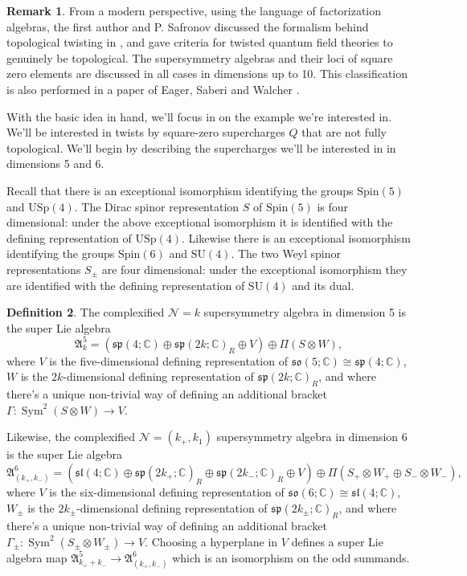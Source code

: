 \documentclass[11pt, oneside, reqno]{amsart}
\theoremstyle{definition} \newtheorem{definition}{Definition}[section]
\theoremstyle{definition} \newtheorem{remark}[definition]{Remark}
\theoremstyle{definition} \newtheorem{remarks}[definition]{Remarks}
\theoremstyle{definition} \newtheorem{question}[definition]{Question}
\theoremstyle{definition} \newtheorem*{note}{Note}
\theoremstyle{definition} \newtheorem{example}[definition]{Example}
\theoremstyle{definition} \newtheorem{examples}[definition]{Examples}
\newcommand{\mr}[1]{\mathrm{#1}}
\newcommand{\mc}[1]{\mathcal{#1}}
\newcommand{\mf}[1]{\mathfrak{#1}}
\newcommand{\CC}{\mathbb{C}}
\newcommand{\SU}{\mathrm{SU}}
\newcommand{\Spin}{\mathrm{Spin}}
\newcommand{\so}{\mathfrak{so}}
\renewcommand{\sl}{\mathfrak{sl}}
\renewcommand{\sp}{\mathfrak{sp}}
\newcommand{\iso}{\cong}
\DeclareMathOperator{\sym}{Sym}
\begin{document}
\begin{remark}
From a modern perspective, using the language of factorization algebras, the first author and P. Safronov discussed the formalism behind topological twisting in \cite{ElliottSafronov}, and gave criteria for twisted quantum field theories to genuinely be topological.  The supersymmetry algebras and their loci of square zero elements are discussed in all cases in dimensions up to 10.  This classification is also performed in a paper of Eager, Saberi and Walcher \cite{EagerSaberiWalcher}.
\end{remark}

With the basic idea in hand, we'll focus in on the example we're interested in.  We'll be interested in twists by square-zero supercharges $Q$ that are not fully topological.  We'll begin by describing the supercharges we'll be interested in in dimensions 5 and 6.

Recall that there is an exceptional isomorphism identifying the groups $\Spin(5)$ and $\mr{USp}(4)$.  The Dirac spinor representation $S$ of $\Spin(5)$ is four dimensional: under the above exceptional isomorphism it is identified with the defining representation of $\mr{USp}(4)$.  Likewise there is an exceptional isomorphism identifying the groups $\Spin(6)$ and $\SU(4)$.  The two Weyl spinor representations $S_\pm$ are four dimensional: under the exceptional isomorphism they are identified with the defining representation of $\SU(4)$ and its dual.

\begin{definition}
The complexified $\mc N=k$ supersymmetry algebra in dimension 5 is the super Lie algebra
\[\mf A^5_k = (\sp(4;\CC) \oplus \sp(2k;\CC)_R \oplus V) \oplus \Pi(S \otimes W),\]
where $V$ is the five-dimensional defining representation of $\so(5;\CC) \iso \sp(4;\CC)$, $W$ is the $2k$-dimensional defining representation of $\sp(2k;\CC)_R$, and where there's a unique non-trivial way of defining an additional bracket $\Gamma \colon \sym^2(S \otimes W) \to V$.

Likewise, the complexified $\mc N=(k_+,k_1)$ supersymmetry algebra in dimension 6 is the super Lie algebra
\[\mf A^6_{(k_+,k_-)} = (\sl(4;\CC) \oplus \sp(2k_+;\CC)_{R} \oplus \sp(2k_-;\CC)_R \oplus V) \oplus \Pi(S_+ \otimes W_+ \oplus S_- \otimes W_-),\]
where $V$ is the six-dimensional defining representation of $\so(6;\CC) \iso \sl(4;\CC)$, $W_\pm$ is the $2k_\pm$-dimensional defining representation of $\sp(2k_\pm;\CC)_R$, and where there's a unique non-trivial way of defining an additional bracket $\Gamma_\pm \colon \sym^2(S_\pm \otimes W_\pm) \to V$.  Choosing a hyperplane in $V$ defines a super Lie algebra map $\mf A^5_{k_+ + k_-} \to \mf A^6_{(k_+,k_-)}$ which is an isomorphism on the odd summands.
\end{definition}
\end{document}
